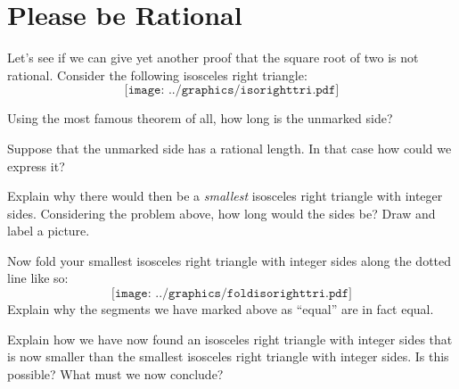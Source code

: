 \newpage
\section{Please be Rational}

Let's see if we can give yet another proof that the square root of two
is not rational. Consider the following isosceles right triangle:
\[
\texttt{[image: ../graphics/isorighttri.pdf]}
\]
\begin{prob}
Using the most famous theorem of all, how long is the unmarked side?
\end{prob}

\begin{prob} 
Suppose that the unmarked side has a rational length. In that case how
could we express it?
\end{prob}

\begin{prob}
Explain why there would then be a \textit{smallest} isosceles right
triangle with integer sides. Considering the problem above, how long
would the sides be? Draw and label a picture.
\end{prob}

\newpage
\begin{prob}
Now fold your smallest isosceles right triangle with integer sides
along the dotted line like so:
\[
\texttt{[image: ../graphics/foldisorighttri.pdf]}
\]
Explain why the segments we have marked above as ``equal'' are in fact
equal.
\end{prob}
\vspace{1in}

\begin{prob}
Explain how we have now found an isosceles right triangle with integer
sides that is now smaller than the smallest isosceles right triangle
with integer sides. Is this possible? What must we now conclude?
\end{prob}
